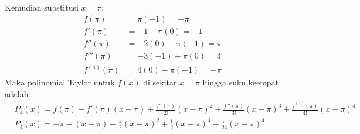 \documentclass[11pt,openany,a4paper]{article}
\begin{document}
\begin{enumerate}
        Kemudian substitusi \( x = \pi \):
        \begin{align*}
            f(\pi) &= \pi(-1) = -\pi\\
            f'(\pi) &= -1 - \pi(0) = -1\\
            f''(\pi) &= -2(0) - \pi(-1) = \pi\\
            f'''(\pi) &= -3(-1) + \pi(0) = 3\\
            f^{(4)}(\pi) &= 4(0) + \pi(-1) = -\pi
        \end{align*}
        Maka polinomial Taylor untuk $f(x)$ di sekitar $x=\pi$ hingga suku keempat adalah
        \begin{align*}
            &P_4(x) = f(\pi)+f'(\pi)(x-\pi)+\frac{f''(\pi)}{2!}(x-\pi)^2+\frac{f'''(\pi)}{3!}(x-\pi)^3+\frac{f^{(4)}(\pi)}{4!}(x-\pi)^4\\
            &\boxed{P_4(x) = -\pi - (x-\pi) + \frac{\pi}{2}(x-\pi)^2 + \frac{1}{2}(x-\pi)^3 - \frac{\pi}{24}(x-\pi)^4}
        \end{align*}
    \end{enumerate}
    
\end{document}
